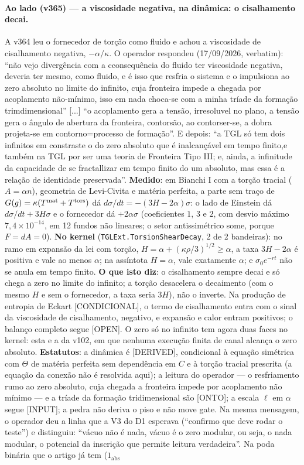 \documentclass[11pt]{article}
\theoremstyle{definition}\newtheorem{deriv}{Derivação}
\begin{document}
\paragraph*{Ao lado (v365) --- a viscosidade negativa, na dinâmica: o cisalhamento decai.} A v364 leu o fornecedor de torção como fluido e achou a viscosidade de cisalhamento negativa, $-\alpha/\kappa$. O operador respondeu (17/09/2026, verbatim): ``não vejo divergência com a cconsequência do fluido ter viscosidade negativa, deveria ter mesmo, como fluido, e é isso que resfria o sistema e o impulsiona ao zero absoluto no limite do infinito, cuja fronteira impede a chegada por acoplamento não-mínimo, isso em nada choca-se com a minha tríade da formação trimdimensional'' [...] ``o acoplamento gera a tensão, irresoluvel no plano, a tensão gera o ângulo de abertura da fronteira, contorsão, ao contorser-se, a dobra projeta-se em contorno=processo de formação''. E depois: ``a TGL só tem dois infinitos em constraste o do zero absoluto que é inalcançável em tempo finito,e também na TGL por ser uma teoria de Fronteira Tipo III; e, ainda, a infinitude da capacidade de se fractallizar em tempo finito do um absoluto, mas essa é a relação de identidade preservada''. \textbf{Medido}: em Bianchi I com a torção tracial ($A=\alpha n$), geometria de Levi-Civita e matéria perfeita, a parte sem traço de $G(g)=\kappa(T^{\rm mat}+T^{\rm tors})$ dá $d\sigma/dt=-(3H-2\alpha)\sigma$: o lado de Einstein dá $d\sigma/dt+3H\sigma$ e o fornecedor dá $+2\alpha\sigma$ (coeficientes $1$, $3$ e $2$, com desvio máximo $7{,}4\times10^{-14}$, em 12 fundos não lineares; o setor antissimétrico some, porque $F=dA=0$). \textbf{No kernel} (\texttt{TGLExt.TorsionShearDecay}, 2 de 2 bandeiras): no ramo em expansão da lei com torção, $H=\alpha+(\kappa\rho/3)^{1/2}\ge\alpha$, a taxa $3H-2\alpha$ é positiva e vale ao menos $\alpha$; na assíntota $H=\alpha$, vale exatamente $\alpha$; e $\sigma_0e^{-rt}$ não se anula em tempo finito. \textbf{O que isto diz}: o cisalhamento sempre decai e só chega a zero no limite do infinito; a torção desacelera o decaimento (com o mesmo $H$ e sem o fornecedor, a taxa seria $3H$), não o inverte. Na produção de entropia de Eckart [CONDICIONAL], o termo de cisalhamento entra com o sinal da viscosidade de cisalhamento, negativo, e expansão e calor entram positivos; o balanço completo segue [OPEN]. O zero só no infinito tem agora duas faces no kernel: esta e a da v102, em que nenhuma execução finita de canal alcança o zero absoluto. \textbf{Estatutos}: a dinâmica é [DERIVED], condicional à equação simétrica com $\Theta$ de matéria perfeita sem dependência em $C$ e à torção tracial prescrita (a equação da conexão não é resolvida aqui); a leitura do operador --- o resfriamento rumo ao zero absoluto, cuja chegada a fronteira impede por acoplamento não mínimo --- e a tríade da formação tridimensional são [ONTO]; a escala $\ell$ em $\alpha$ segue [INPUT]; a pedra não deriva o piso e não move gate. Na mesma mensagem, o operador deu a linha que a V3 do D1 esperava (``confirmo que deve rodar o teste'') e distinguiu: ``vácuo não é nada, vácuo é o zero modular, ou seja, o nada modular, o potencial da inscrição que permite leitura verdadeira''. Na poda binária que o artigo já tem ($1_{\mathrm{abs}}$ 
\end{document}
